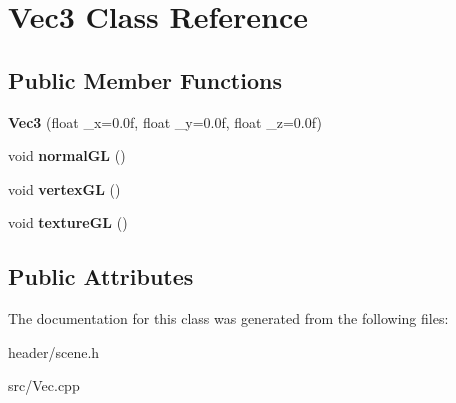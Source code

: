 \hypertarget{classVec3}{
\section{Vec3 Class Reference}
\label{classVec3}
}
\subsection*{Public Member Functions}
\begin{DoxyCompactItemize}
\item 
\hypertarget{classVec3_a7cdc21cdb9bc91aaf00b3aae077eab5f}{
{\bfseries Vec3} (float \_\-x=0.0f, float \_\-y=0.0f, float \_\-z=0.0f)}
\label{classVec3_a7cdc21cdb9bc91aaf00b3aae077eab5f}

\item 
\hypertarget{classVec3_a58bdb289aef592de8942d4af8956dc14}{
void {\bfseries normalGL} ()}
\label{classVec3_a58bdb289aef592de8942d4af8956dc14}

\item 
\hypertarget{classVec3_a939ff41aa8950141772f6fbe874576b8}{
void {\bfseries vertexGL} ()}
\label{classVec3_a939ff41aa8950141772f6fbe874576b8}

\item 
\hypertarget{classVec3_a8ae14845b6593f9753a5a1cdd4bbedc7}{
void {\bfseries textureGL} ()}
\label{classVec3_a8ae14845b6593f9753a5a1cdd4bbedc7}

\end{DoxyCompactItemize}
\subsection*{Public Attributes}


The documentation for this class was generated from the following files:\begin{DoxyCompactItemize}
\item 
header/scene.h\item 
src/Vec.cpp\end{DoxyCompactItemize}
